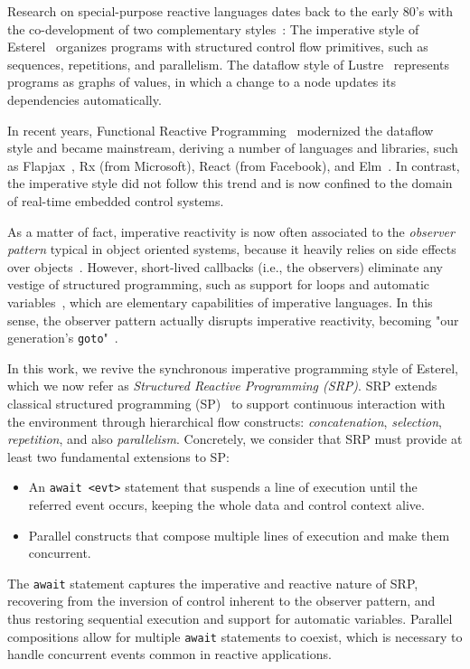 \documentclass{acm_proc_article-sp}
\newcommand{\code}[1] {{\small{\texttt{#1}}}}
\newcommand{\1}{\;}
\newcommand{\2}{\;\;}
\newcommand{\3}{\;\;\;}
\newcommand{\5}{\;\;\;\;\;}
\begin{document}
Research on special-purpose reactive languages dates back to the early 80's 
with the co-development of two complementary 
styles~\cite{rp.twelve,rp.hypothesis}:
%
The imperative style of Esterel~\cite{esterel.ieee91} organizes programs with 
structured control flow primitives, such as sequences, repetitions, and 
parallelism.
%
The dataflow style of Lustre~\cite{lustre.ieee91} represents programs as graphs 
of values, in which a change to a node updates its dependencies automatically.

In recent years, Functional Reactive Programming~\cite{frp.principles} 
modernized the dataflow style and became mainstream, deriving a number of 
languages and libraries, such as Flapjax~\cite{frp.flapjax}, Rx (from 
Microsoft), React (from Facebook), and Elm~\cite{frp.elm}.
%
In contrast, the imperative style did not follow this trend and is now confined 
to the domain of real-time embedded control systems.

As a matter of fact, imperative reactivity is now often associated to the 
\emph{observer pattern} typical in object oriented systems, because it heavily 
relies on side effects over objects~\cite{rp.deprecating,rp.rescala}.
%
However, short-lived callbacks (i.e., the observers) eliminate any vestige of 
structured programming, such as support for loops and automatic 
variables~\cite{sync_async.cooperative}, which are elementary capabilities of 
imperative languages.
%
In this sense, the observer pattern actually disrupts imperative reactivity, 
becoming "our generation's \code{goto}"~\cite{dij.goto,rp.goto,elm.goto}.

In this work, we revive the synchronous imperative programming style of 
Esterel, which we now refer as \emph{Structured Reactive Programming (SRP)}.
%
SRP extends classical structured programming (SP)~\cite{dij.notes} to support 
continuous interaction with the environment through hierarchical flow 
constructs: \emph{concatenation}, \emph{selection}, \emph{repetition}, and also 
\emph{parallelism}.
%
Concretely, we consider that SRP must provide at least two fundamental 
extensions to SP:
%
\begin{itemize}
\item An \code{await <evt>} statement that suspends a line of execution until 
the referred event occurs, keeping the whole data and control context alive.
\item Parallel constructs that compose multiple lines of execution and make 
them concurrent.
\end{itemize}
%
The \code{await} statement captures the imperative and reactive nature of SRP, 
recovering from the inversion of control inherent to the observer pattern, and 
thus restoring sequential execution and support for automatic variables.
Parallel compositions allow for multiple \code{await} statements to coexist, 
which is necessary to handle concurrent events common in reactive applications.
\end{document}

